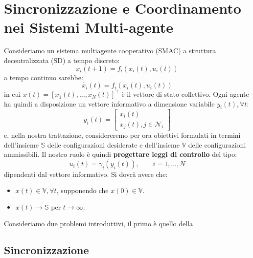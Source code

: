 \section{Sincronizzazione e Coordinamento nei Sistemi Multi-agente}

Consideriamo un sistema multiagente cooperativo (SMAC) a struttura decentralizzata (SD) a tempo discreto:
\begin{equation}
x_i (t+1) = f_i (x_i (t), u_i (t))
\end{equation}
a tempo continuo sarebbe:
\begin{equation}
\dot{x_i}(t) = f_i (x_i (t), u_i (t))
\end{equation}
in cui $x(t) = [x_1(t), \dots, x_N(t)]^\intercal$ \`e il vettore di stato collettivo. Ogni agente ha quindi a disposizione un vettore informativo a dimensione variabile $y_i(t), \forall t$:
\begin{equation}
y_i(t) = \begin{bmatrix}
x_i(t) \\
x_j(t), j \in \mathcal{N}_i
\end{bmatrix}
\end{equation}
e, nella nostra trattazione, considereremo per ora obiettivi formulati in termini dell'insieme $\mathbb{S}$ delle configurazioni desiderate e dell'insieme $\mathbb{V}$ delle configurazioni ammissibili. Il nostro ruolo \`e quindi \textbf{progettare leggi di controllo} del tipo:
\begin{equation}
u_i(t) = \gamma_i(y_i(t)), \qquad i = 1, \dots, N
\end{equation}
dipendenti dal vettore informativo. Si dovr\`a avere che:
\begin{itemize}
    \item $x(t) \in \mathbb{V}, \forall t$, supponendo che $x(0) \in \mathbb{V}$.
    \item $x(t) \to \mathbb{S}$ per $t \to \infty$.
\end{itemize}

Consideriamo due problemi introduttivi, il primo \`e quello della

\subsection{Sincronizzazione}

